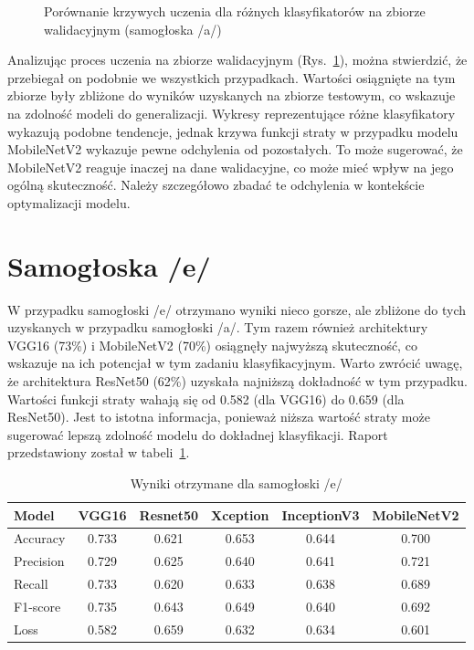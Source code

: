 \begin{figure}[ht]
    \caption{Porównanie krzywych uczenia dla różnych klasyfikatorów na zbiorze walidacyjnym (samogłoska /a/)}
    \label{fig:a_results}
\end{figure}

Analizując proces uczenia na zbiorze walidacyjnym (Rys.~\ref{fig:a_results}),  można stwierdzić, że przebiegał on podobnie we wszystkich przypadkach.
Wartości osiągnięte na tym zbiorze były zbliżone do wyników uzyskanych na zbiorze testowym, co wskazuje na zdolność modeli do generalizacji.
Wykresy reprezentujące różne klasyfikatory wykazują podobne tendencje, jednak krzywa funkcji straty w przypadku modelu MobileNetV2 wykazuje pewne odchylenia od pozostałych.
To może sugerować, że MobileNetV2 reaguje inaczej na dane walidacyjne, co może mieć wpływ na jego ogólną skuteczność.
Należy szczegółowo zbadać te odchylenia w kontekście optymalizacji modelu.

\section{Samogłoska /e/}
\label{sec:samogloska-e}

W przypadku samogłoski /e/ otrzymano wyniki nieco gorsze, ale zbliżone do tych uzyskanych w przypadku samogłoski /a/.
Tym razem również architektury VGG16 (73\%) i MobileNetV2 (70\%) osiągnęły najwyższą skuteczność, co wskazuje na ich potencjał w tym zadaniu klasyfikacyjnym.
Warto zwrócić uwagę, że architektura ResNet50 (62\%) uzyskała najniższą dokładność w tym przypadku.
Wartości funkcji straty wahają się od 0.582 (dla VGG16) do 0.659 (dla ResNet50).
Jest to istotna informacja, ponieważ niższa wartość straty może sugerować lepszą zdolność modelu do dokładnej klasyfikacji.
Raport przedstawiony został w tabeli~\ref{tab:wyniki-e}.

\begin{table}[ht]
\centering
\caption{Wyniki otrzymane dla samogłoski /e/}
\label{tab:wyniki-e}
\begin{tabular}{|l|c|c|c|c|c|}
\hline
\textbf{Model} &\textbf{VGG16} &\textbf{Resnet50} &\textbf{Xception} &\textbf{InceptionV3} &\textbf{MobileNetV2} \\ \hline
    Accuracy &0.733 &0.621 &0.653 &0.644 &0.700 \\ \hline
    Precision &0.729 &0.625 &0.640 &0.641 &0.721 \\ \hline
    Recall &0.733 &0.620 &0.633 &0.638 &0.689 \\ \hline
    F1-score &0.735 &0.643 &0.649 &0.640 &0.692 \\ \hline
    Loss &0.582 &0.659 &0.632 &0.634 &0.601 \\ \hline
\end{tabular}
\end{table}


